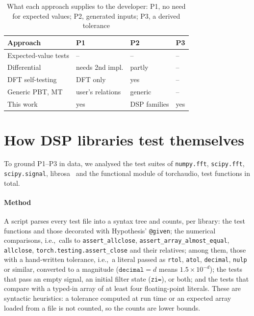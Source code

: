 \documentclass[10pt,conference]{IEEEtran}
\newcommand{\code}[1]{\texttt{#1}}
\newcommand{\ie}{i.e.,\ }
\begin{document}
\begin{table}[t]
\caption{What each approach supplies to the developer: P1, no need for expected values; P2, generated inputs; P3, a derived tolerance}
\label{tab:positioning}
\centering\scriptsize
\begin{tabular}{@{}llll@{}}
\toprule
Approach & P1 & P2 & P3 \\
\midrule
Expected-value tests & -- & -- & -- \\
Differential~\cite{vanover2020fpdiff} & needs 2nd impl. & partly & -- \\
DFT self-testing~\cite{ergun1995testing,fftwverify} & DFT only & yes & -- \\
Generic PBT, MT~\cite{maciver2019hypothesis,chen2018metamorphic} & user's relations & generic & -- \\
This work & yes & DSP families & yes \\
\bottomrule
\end{tabular}
\end{table}

\section{How DSP libraries test themselves}
\label{sec:survey}

To ground P1--P3 in data, we analysed the test suites of \code{numpy.fft},
\code{scipy.fft}, \code{scipy.signal}, librosa~\cite{mcfee2015librosa} and the
functional module of torchaudio, \surveyTotalTests{} test functions in total.

\paragraph*{Method} A script parses every test file into a syntax tree and
counts, per library: the test functions and those decorated with Hypothesis'
\code{@given}; the numerical comparisons, \ie calls to \code{assert\_allclose},
\code{assert\_array\_almost\_equal}, \code{allclose},
\code{torch.testing.assert\_close} and their relatives; among them, those with a
hand-written tolerance, \ie a literal passed as \code{rtol}, \code{atol},
\code{decimal}, \code{nulp} or similar, converted to a magnitude
($\code{decimal}=d$ means $1.5\times10^{-d}$); the tests that pass an empty
signal, an initial filter state (\code{zi=}), or both; and the tests that compare
with a typed-in array of at least four floating-point literals. These are
syntactic heuristics: a tolerance computed at run time or an expected array
loaded from a file is not counted, so the counts are lower bounds.
\end{document}
